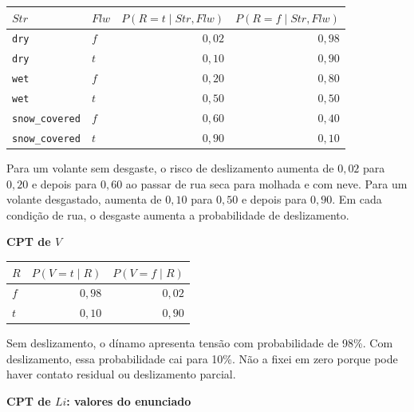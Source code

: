 \documentclass[11pt,a4paper]{article}
\newcommand{\subtitulo}[1]{\par\medskip\textbf{\textcolor{accent}{#1}}\par}
\begin{document}
{\def\LTcaptype{none} %
\begin{longtable}[]{@{}llrr@{}}
\toprule\noalign{}
\(Str\) & \(Flw\) & \(P(R=t\mid Str,Flw)\) & \(P(R=f\mid Str,Flw)\) \\
\midrule\noalign{}
\endhead
\bottomrule\noalign{}
\endlastfoot
\texttt{dry} & \(f\) & \(0{,}02\) & \(0{,}98\) \\
\texttt{dry} & \(t\) & \(0{,}10\) & \(0{,}90\) \\
\texttt{wet} & \(f\) & \(0{,}20\) & \(0{,}80\) \\
\texttt{wet} & \(t\) & \(0{,}50\) & \(0{,}50\) \\
\texttt{snow\_covered} & \(f\) & \(0{,}60\) & \(0{,}40\) \\
\texttt{snow\_covered} & \(t\) & \(0{,}90\) & \(0{,}10\) \\
\end{longtable}
}

Para um volante sem desgaste, o risco de deslizamento aumenta de \(0{,}02\) para \(0{,}20\) e depois para \(0{,}60\) ao passar de rua seca para molhada e com neve. Para um volante desgastado, aumenta de \(0{,}10\) para \(0{,}50\) e depois para \(0{,}90\). Em cada condição de rua, o desgaste aumenta a probabilidade de deslizamento.

\subtitulo{\texorpdfstring{CPT de \(V\)}{CPT de V}}\label{cpt-de-v-1}

{\def\LTcaptype{none} %
\begin{longtable}[]{@{}lrr@{}}
\toprule\noalign{}
\(R\) & \(P(V=t\mid R)\) & \(P(V=f\mid R)\) \\
\midrule\noalign{}
\endhead
\bottomrule\noalign{}
\endlastfoot
\(f\) & \(0{,}98\) & \(0{,}02\) \\
\(t\) & \(0{,}10\) & \(0{,}90\) \\
\end{longtable}
}

Sem deslizamento, o dínamo apresenta tensão com probabilidade de 98\%. Com deslizamento, essa probabilidade cai para 10\%. Não a fixei em zero porque pode haver contato residual ou deslizamento parcial.

\clearpage
\subtitulo{\texorpdfstring{CPT de \(Li\): valores do enunciado}{CPT de Li: valores do enunciado}}\label{cpt-de-li-valores-do-enunciado}
\end{document}
